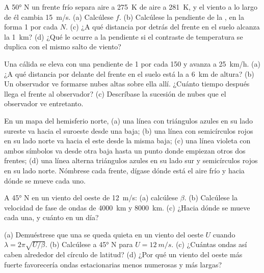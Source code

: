 \begin{exercise}[$\star$]\label{exo:b2:weather-systems:1}
A \ang{50} N un frente frío separa aire a \qty{275}{K} de aire a \qty{281}{K}, y el viento
a lo largo de él cambia \qty{15}{m/s}. (a) Calcúlese $f$. (b) Calcúlese la pendiente de la ,
en la forma 1 por cada $N$. (c) ¿A qué distancia por detrás del frente en el suelo alcanza la 
\qty{1}{km}? (d) ¿Qué le ocurre a la pendiente si el contraste de temperatura se duplica con el mismo salto
de viento?
\end{exercise}

\begin{exercise}[$\star$]\label{exo:b2:weather-systems:2}
Una  cálida se eleva con una pendiente de 1 por cada 150 y avanza a \qty{25}{km/h}. (a) ¿A qué distancia por delante del
frente en el suelo está la  a \qty{6}{km} de altura? (b) Un observador ve formarse nubes altas
sobre ella allí. ¿Cuánto tiempo después llega el frente al observador? (c) Descríbase la sucesión de
nubes que el observador ve entretanto.
\end{exercise}

\begin{exercise}[$\star$]\label{exo:b2:weather-systems:3}
En un mapa del hemisferio norte, (a) una línea con triángulos azules en su lado sureste va hacia el suroeste
desde una baja; (b) una línea con semicírculos rojos en su lado norte va hacia el este desde la misma baja; (c) una
línea violeta con ambos símbolos va desde otra baja hasta un punto donde empiezan otros dos frentes;
(d) una línea alterna triángulos azules en su lado sur y semicírculos rojos en su lado norte.
Nómbrese cada frente, dígase dónde está el aire frío y hacia dónde se mueve cada uno.
\end{exercise}

\begin{exercise}[$\star$]\label{exo:b2:weather-systems:4}
A \ang{45} N en un viento del oeste de \qty{12}{m/s}: (a) calcúlese $\beta$. (b) Calcúlese la velocidad de fase
de ondas de \qty{4000}{km} y \qty{8000}{km}. (c) ¿Hacia dónde se mueve cada una, y cuánto en un
día?
\end{exercise}

\begin{exercise}[$\star\star$]\label{exo:b2:weather-systems:5}
(a) Demuéstrese que una  se queda quieta en un viento del oeste $U$ cuando $\lambda = 2\pi\sqrt{U/\beta}$.
(b) Calcúlese a \ang{45} N para $U = \qty{12}{m/s}$. (c) ¿Cuántas ondas así caben alrededor del
círculo de latitud? (d) ¿Por qué un viento del oeste más fuerte favorecería ondas estacionarias menos numerosas y más largas?
\end{exercise}

